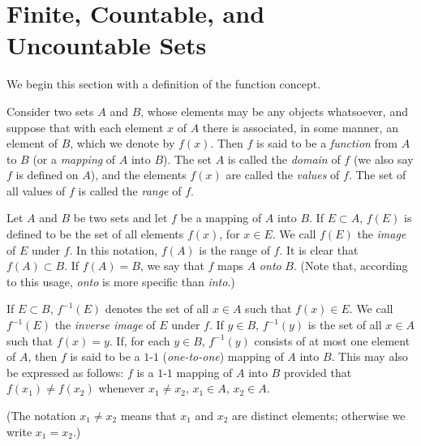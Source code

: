 \section{Finite, Countable, and Uncountable Sets}

We begin this section with a definition of the function concept.

\begin{definition}
    Consider two sets \(A\) and \(B\), whose elements may be any objects whatsoever, and suppose that with each element \(x\) of \(A\) there is associated, in some manner, an element of \(B\), which we denote by \(f\left(x\right)\). Then \(f\) is said to be a \emph{function} from \(A\) to \(B\) (or a \emph{mapping} of \(A\) into \(B\)). The set \(A\) is called the \emph{domain} of \(f\) (we also say \(f\) is defined on \(A\)), and the elements \(f\left(x\right)\) are called the \emph{values} of \(f\). The set of all values of \(f\) is called the \emph{range} of \(f\).
\end{definition}

\begin{definition}
    Let \(A\) and \(B\) be two sets and let \(f\) be a mapping of \(A\) into \(B\). If \(E\subset A\), \(f\left(E\right)\) is defined to be the set of all elements \(f\left(x\right)\), for \(x\in E\). We call \(f\left(E\right)\) the \emph{image} of \(E\) under \(f\). In this notation, \(f\left(A\right)\) is the range of \(f\). It is clear that \(f\left(A\right)\subset B\). If \(f\left(A\right)=B\), we say that \(f\) maps \(A\) \emph{onto} \(B\). (Note that, according to this usage, \emph{onto} is more specific than \emph{into}.)
    
    If \(E\subset B\), \(f^{-1}\left(E\right)\) denotes the set of all \(x\in A\) such that \(f\left(x\right)\in E\). We call \(f^{-1}\left(E\right)\) the \emph{inverse image} of \(E\) under \(f\). If \(y\in B\), \(f^{-1}\left(y\right)\) is the set of all \(x\in A\) such that \(f\left(x\right)=y\). If, for each \(y\in B\), \(f^{-1}\left(y\right)\) consists of at most one element of \(A\), then \(f\) is said to be a \(1\)-\(1\) (\emph{one-to-one}) mapping of \(A\) into \(B\). This may also be expressed as follows: \(f\) is a \(1\)-\(1\) mapping of \(A\) into \(B\) provided that \(f\left(x_1\right)\ne f\left(x_2\right)\) whenever \(x_1\ne x_2\), \(x_1\in A\), \(x_2\in A\).
    
    (The notation \(x_1\ne x_2\)  means that \(x_1\) and \(x_2\) are distinct elements; otherwise we write \(x_1=x_2\).)
\end{definition}

